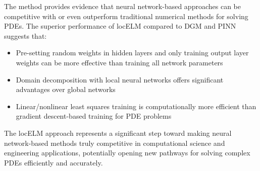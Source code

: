\documentclass[11pt,a4paper]{article}
\begin{document}
The method provides evidence that neural network-based approaches can be competitive with or even outperform traditional numerical methods for solving PDEs. The superior performance of locELM compared to DGM and PINN suggests that:

\begin{itemize}
    \item Pre-setting random weights in hidden layers and only training output layer weights can be more effective than training all network parameters
    
    \item Domain decomposition with local neural networks offers significant advantages over global networks
    
    \item Linear/nonlinear least squares training is computationally more efficient than gradient descent-based training for PDE problems
\end{itemize}

The locELM approach represents a significant step toward making neural network-based methods truly competitive in computational science and engineering applications, potentially opening new pathways for solving complex PDEs efficiently and accurately.
\end{document}
